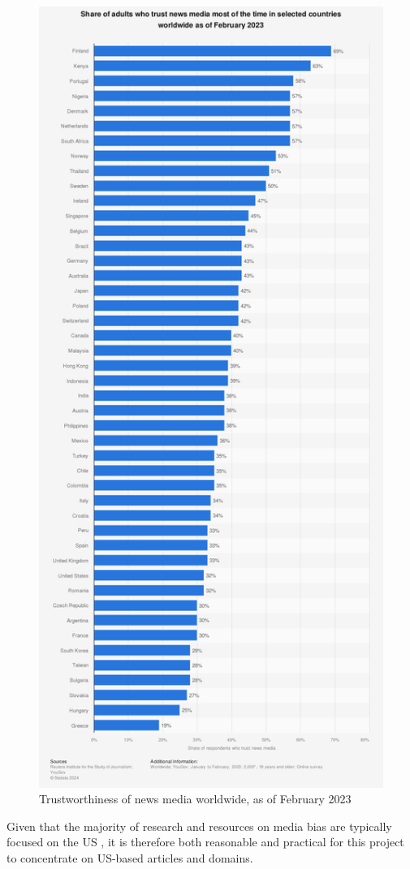 \begin{figure}[htbp]
    \centering
    \includegraphics[width=0.6\linewidth]{images/statistic_id308468_trustworthiness-of-news-media-worldwide-2023.png}
    \caption{Trustworthiness of news media worldwide, as of February 2023 \cite{reuters-2023-trust}}
    \label{fig:trustworthiness-of-news-media-worldwide-2023}
\end{figure}

Given that the majority of research and resources on media bias are typically focused on the US \cite{allsides, adfontes,rodrigo-2024-systematic-review-media-bias}, it is therefore both reasonable and practical for this project to concentrate on US-based articles and domains.


